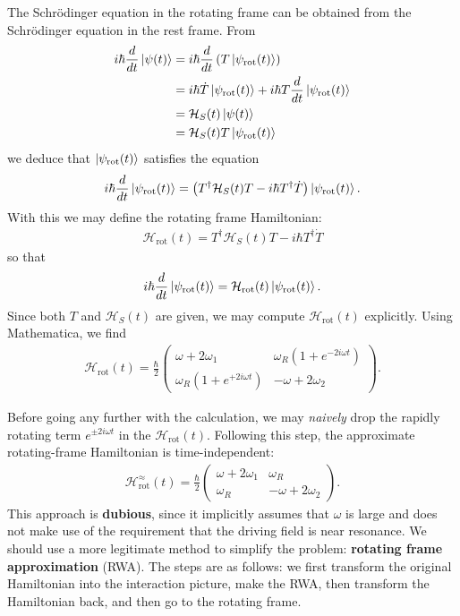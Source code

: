 \documentclass{article}
\theoremstyle{definition}
\newcommand{\ham}{\mathcal{H}}
\newcommand{\f}[2]{\frac{#1}{#2}}
\newcommand{\lp}{\left(}
\newcommand{\rp}{\right)}
\newcommand{\psirot}{\ket{\psi_\text{rot}(t)} }
\begin{document}
\begin{enumerate}[label=\alph*)]
	The Schr\"{o}dinger equation in the rotating frame can be obtained from the Schr\"{o}dinger equation in the rest frame. From
	\begin{align*}
	i\hbar \f{d}{dt}\ket{\psi(t)} 
	&= i\hbar \f{d}{dt}\lp T\psirot \rp \\
	&= i\hbar \dot T \psirot + i\hbar T \f{d}{dt}\psirot\\
	&= \ham_S(t)\ket{\psi(t)} \\
	&= \ham_S(t) T\psirot
	\end{align*}
	we deduce that $\psirot$ satisfies the equation
	\begin{align*}
	i\hbar \f{d}{dt}\psirot = \lp T^\dagger \ham_S(t) T -i\hbar T^\dagger \dot T \rp \psirot.
	\end{align*} 
	With this we may define the rotating frame Hamiltonian:
	\begin{align*}
	\ham_\text{rot}(t) = T^\dagger \ham_S(t) T -i\hbar T^\dagger \dot T
	\end{align*}
	so that
	\begin{align*}
	i\hbar \f{d}{dt}\psirot = \ham_\text{rot}(t) \psirot.
	\end{align*}
	Since both $T$ and $\ham_S(t)$ are given, we may compute $\ham_\text{rot}(t)$ explicitly. Using Mathematica, we find
	\begin{align*}
	\ham_\text{rot}(t) = \f{\hbar}{2} \begin{pmatrix}
	 \omega +  2\omega_1 & \omega_R (1+e^{-2i\omega t}) \\ 
	 \omega_R (1+e^{+2i\omega t}) & -\omega + 2\omega_2
	\end{pmatrix}.
	\end{align*}
	
	Before going any further with the calculation, we may \textit{naively} drop the rapidly rotating term $e^{\pm 2i\omega t}$ in the $\ham_\text{rot}(t)$. Following this step, the approximate rotating-frame Hamiltonian is time-independent:
	\begin{align*}
	\ham_\text{rot}^\approx (t) =  \f{\hbar}{2} \begin{pmatrix}
	\omega +  2\omega_1 & \omega_R \\ 
	\omega_R  & -\omega + 2\omega_2
	\end{pmatrix}.
	\end{align*}
	This approach is \textbf{ dubious}, since it implicitly assumes that $\omega$ is large and does not make use of the requirement that the driving field is near resonance. We should use a more legitimate method to simplify the problem:  \textbf{rotating frame approximation} (RWA).  The steps are as follows: we first transform the original Hamiltonian into the interaction picture, make the RWA, then transform the Hamiltonian back, and then go to the rotating frame. \\
	

\end{enumerate}
\end{document}
